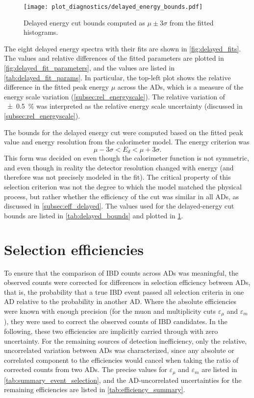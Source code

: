 \begin{figure}
    \centering
    \texttt{[image: plot\_diagnostics/delayed\_energy\_bounds.pdf]}
    \caption[Delayed energy cut bounds]{
        Delayed energy cut bounds computed as $\mu\pm 3\sigma$
        from the fitted histograms.
    }
    \label{fig:delayed_bounds}
\end{figure}

The eight delayed energy spectra with their fits are shown in \cref{fig:delayed_fits}.
The values and relative differences of the fitted parameters
are plotted in \cref{fig:delayed_fit_parameters},
and the values are listed in \cref{tab:delayed_fit_params}.
In particular, the top-left plot shows the relative difference
in the fitted peak energy $\mu$ across the ADs,
which is a measure of the energy scale variation (\cref{subsec:rel_energyscale}).
The relative variation of \SI{+-0.5}{\percent}
was interpreted as the relative energy scale uncertainty
(discussed in \cref{subsec:rel_energyscale}).

The bounds for the delayed energy cut were computed
based on the fitted peak value and energy resolution
from the calorimeter model.
The energy criterion was
\begin{equation}\label{eq:delayed_cut}
    \mu - 3\sigma < E_d < \mu + 3\sigma.
\end{equation}
This form was decided on even though the calorimeter function
is not symmetric, and even though in reality
the detector resolution changed with energy
(and therefore was not precisely modeled in the fit).
The critical property of this selection criterion was
not the degree to which the model matched the physical process,
but rather whether the efficiency of the cut was similar in all ADs,
as discussed in \cref{subsec:eff_delayed}.
The values used for the delayed-energy cut bounds are listed in \cref{tab:delayed_bounds}
and plotted in \cref{fig:delayed_bounds}.

\section{Selection efficiencies}
\label{sec:efficiencies}

To ensure that the comparison of IBD counts across ADs was meaningful,
the observed counts were corrected
for differences in selection efficiency between ADs,
that is, the probability that a true IBD event
passed all selection criteria in one AD
relative to the probability in another AD.
Where the absolute efficiencies were known with enough precision
(for the muon and multiplicity cuts $\varepsilon_\mu$ and $\varepsilon_m$),
they were used to correct the observed counts of IBD candidates.
In the following, these two efficiencies are implicitly carried through
with zero uncertainty.
For the remaining sources of detection inefficiency,
only the relative, uncorrelated variation between ADs was characterized,
since any absolute or correlated component to the efficiencies
would cancel when taking the ratio of corrected counts from two ADs.
The precise values for $\varepsilon_\mu$ and $\varepsilon_m$
are listed in \cref{tab:summary_event_selection},
and the AD-uncorrelated uncertainties for the remaining efficiencies
are listed in \cref{tab:efficiency_summary}.

